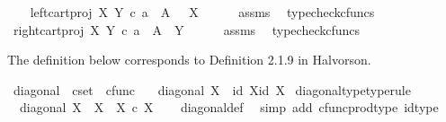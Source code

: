 \begin{isabellebody}
\ \ \isamarkupfalse%
\ {\isachardoublequoteopen}left{\isacharunderscore}{\kern0pt}cart{\isacharunderscore}{\kern0pt}proj\ X\ Y\ {\isasymcirc}\isactrlsub c\ a\ {\isacharcolon}{\kern0pt}\ A\ {\isasymrightarrow}\ \ X{\isachardoublequoteclose}\isanewline
\ \ \ \ \isamarkupfalse%
\ assms\ \isamarkupfalse%
\ typecheck{\isacharunderscore}{\kern0pt}cfuncs\isanewline
\ \ \isamarkupfalse%
\ {\isachardoublequoteopen}right{\isacharunderscore}{\kern0pt}cart{\isacharunderscore}{\kern0pt}proj\ X\ Y\ {\isasymcirc}\isactrlsub c\ a\ {\isacharcolon}{\kern0pt}\ A\ {\isasymrightarrow}\ Y{\isachardoublequoteclose}\isanewline
\ \ \ \ \isamarkupfalse%
\ assms\ \isamarkupfalse%
\ typecheck{\isacharunderscore}{\kern0pt}cfuncs\isanewline
{}\isamarkupfalse%
%
\endisatagproof
{\isafoldproof}%
%
\isadelimproof
%
\endisadelimproof
%
\isadelimdocument
%
\endisadelimdocument
%
\isatagdocument
%
\isamarkuptrue%
%
\endisatagdocument
{\isafolddocument}%
%
\isadelimdocument
%
\endisadelimdocument
%
\begin{isamarkuptext}%
The definition below corresponds to Definition 2.1.9 in Halvorson.%
\end{isamarkuptext}\isamarkuptrue%
\isamarkupfalse%
\ diagonal\ {\isacharcolon}{\kern0pt}{\isacharcolon}{\kern0pt}\ {\isachardoublequoteopen}cset\ {\isasymRightarrow}\ cfunc{\isachardoublequoteclose}\ \isanewline
\ \ {\isachardoublequoteopen}diagonal\ X\ {\isacharequal}{\kern0pt}\ {\isasymlangle}id\ X{\isacharcomma}{\kern0pt}id\ X{\isasymrangle}{\isachardoublequoteclose}\isanewline
\isanewline
{}\isamarkupfalse%
\ diagonal{\isacharunderscore}{\kern0pt}type{\isacharbrackleft}{\kern0pt}type{\isacharunderscore}{\kern0pt}rule{\isacharbrackright}{\kern0pt}{\isacharcolon}{\kern0pt}\isanewline
\ \ {\isachardoublequoteopen}diagonal\ X\ {\isacharcolon}{\kern0pt}\ X\ {\isasymrightarrow}\ X\ {\isasymtimes}\isactrlsub c\ X{\isachardoublequoteclose}\isanewline
%
\isadelimproof
\ \ %
\endisadelimproof
%
\isatagproof
{}\isamarkupfalse%
\ diagonal{\isacharunderscore}{\kern0pt}def\ \isamarkupfalse%
\ {\isacharparenleft}{\kern0pt}simp\ add{\isacharcolon}{\kern0pt}\ cfunc{\isacharunderscore}{\kern0pt}prod{\isacharunderscore}{\kern0pt}type\ id{\isacharunderscore}{\kern0pt}type{\isacharparenright}{\kern0pt}%
\endisatagproof
{\isafoldproof}%
%
\isadelimproof
\isanewline
%
\endisadelimproof
\isanewline
{}\isamarkupfalse%

\end{isabellebody}
